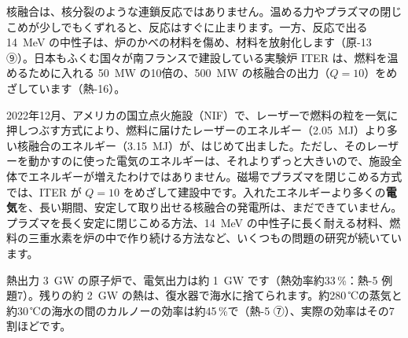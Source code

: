 核融合は、核分裂のような連鎖反応ではありません。温める力やプラズマの閉じこめが少しでもくずれると、反応はすぐに止まります。一方、反応で出る \qty{14}{MeV} の中性子は、炉のかべの材料を傷め、材料を放射化します（原-13 ⑨）。日本もふくむ国々が南フランスで建設している実験炉 ITER は、燃料を温めるために入れる \qty{50}{MW} の10倍の、\qty{500}{MW} の核融合の出力（$Q=10$）をめざしています（熱-16）。

\begin{phmada}
2022年12月、アメリカの国立点火施設（NIF）で、レーザーで燃料の粒を一気に押しつぶす方式により、燃料に届けたレーザーのエネルギー（\qty{2.05}{MJ}）より多い核融合のエネルギー（\qty{3.15}{MJ}）が、はじめて出ました。ただし、そのレーザーを動かすのに使った電気のエネルギーは、それよりずっと大きいので、施設全体でエネルギーが増えたわけではありません。磁場でプラズマを閉じこめる方式では、ITER が $Q=10$ をめざして建設中です。入れたエネルギーより多くの\textbf{電気}を、長い期間、安定して取り出せる核融合の発電所は、まだできていません。プラズマを長く安定に閉じこめる方法、\qty{14}{MeV} の中性子に長く耐える材料、燃料の三重水素を炉の中で作り続ける方法など、いくつもの問題の研究が続いています。
\end{phmada}

\label{ph:原-15:sec13}
熱出力 \qty{3}{GW} の原子炉で、電気出力は約 \qty{1}{GW} です（熱効率約33\,\%：熱-5 例題7）。残りの約 \qty{2}{GW} の熱は、復水器で海水に捨てられます。約280\,℃の蒸気と約30\,℃の海水の間のカルノーの効率は約45\,\%で（熱-5 ⑦）、実際の効率はその7割ほどです。

\begin{bkfigure}
\label{ph:原-15:fig-heatflow}
\end{bkfigure}

